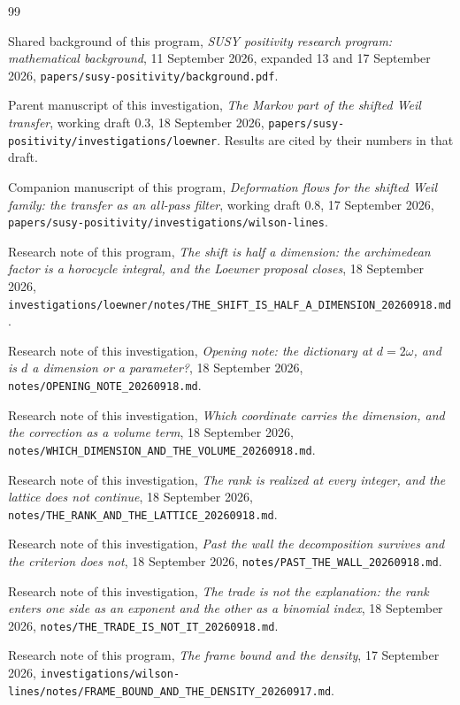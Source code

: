 \begin{thebibliography}{99}
\raggedright
{}
Shared background of this program, \emph{SUSY positivity research program:
mathematical background}, 11 September 2026, expanded 13 and 17 September 2026,
\texttt{papers/susy-positivity/background.pdf}.

Parent manuscript of this investigation, \emph{The Markov part of the shifted
Weil transfer}, working draft 0.3, 18 September 2026,
\texttt{papers/susy-positivity/investigations/loewner}. Results are cited by
their numbers in that draft.

Companion manuscript of this program, \emph{Deformation flows for the shifted
Weil family: the transfer as an all-pass filter}, working draft 0.8,
17 September 2026,
\texttt{papers/susy-positivity/investigations/wilson-lines}.

Research note of this program, \emph{The shift is half a dimension: the
archimedean factor is a horocycle integral, and the Loewner proposal closes},
18 September 2026,
\texttt{investigations/loewner/notes/\allowbreak THE\_SHIFT\_IS\_HALF\_A\_DIMENSION\_20260918.md}.

Research note of this investigation, \emph{Opening note: the dictionary at
$d=2\omega$, and is $d$ a dimension or a parameter?}, 18 September 2026,
\texttt{notes/OPENING\_NOTE\_20260918.md}.

Research note of this investigation, \emph{Which coordinate carries the
dimension, and the correction as a volume term}, 18 September 2026,
\texttt{notes/\allowbreak WHICH\_DIMENSION\_AND\_THE\_VOLUME\_20260918.md}.

Research note of this investigation, \emph{The rank is realized at every
integer, and the lattice does not continue}, 18 September 2026,
\texttt{notes/THE\_RANK\_AND\_THE\_LATTICE\_20260918.md}.

Research note of this investigation, \emph{Past the wall the decomposition
survives and the criterion does not}, 18 September 2026,
\texttt{notes/PAST\_THE\_WALL\_20260918.md}.

Research note of this investigation, \emph{The trade is not the explanation: the
rank enters one side as an exponent and the other as a binomial index},
18 September 2026,
\texttt{notes/THE\_TRADE\_IS\_NOT\_IT\_20260918.md}.

Research note of this program, \emph{The frame bound and the density},
17 September 2026,
\texttt{investigations/wilson-lines/notes/\allowbreak FRAME\_BOUND\_AND\_THE\_DENSITY\_20260917.md}.


\end{thebibliography}
